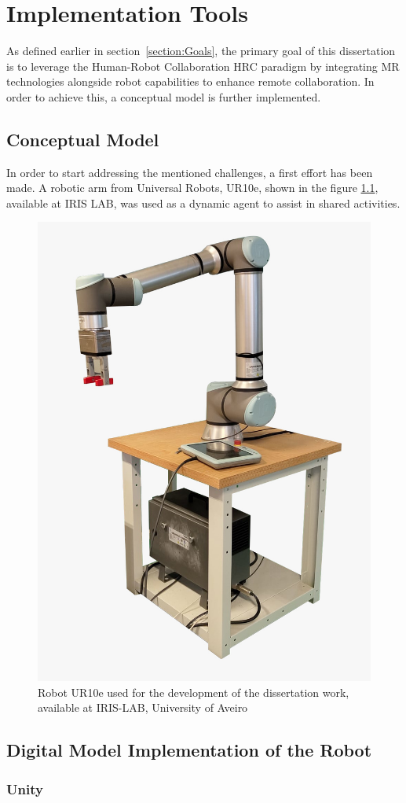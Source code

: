 \chapter{Implementation Tools}%
\label{chapter:tools}

As defined earlier in section~\ref{section:Goals}, the primary goal of this dissertation is to leverage the Human-Robot Collaboration \ac{HRC} paradigm by integrating \ac{MR} technologies alongside robot capabilities to enhance remote collaboration. In order to achieve this, a conceptual model is further implemented.

\section{Conceptual Model}
In order to start addressing the mentioned challenges, a first effort has been made. A robotic arm from Universal Robots, UR10e, shown in the figure \ref{f:ur10e_iris}, available at IRIS LAB, was used as a dynamic agent to assist in shared activities.

\begin{figure}[h]
    \centering
    \includegraphics[width=0.4\linewidth]{figs/ur10e.jpeg}
    \caption{Robot UR10e used for the development of the dissertation work, available at IRIS-LAB, University of Aveiro}
    \label{f:ur10e_iris}
\end{figure}


\section{Digital Model Implementation of the Robot}
\label{section:digital-model}

\subsection{Unity}

